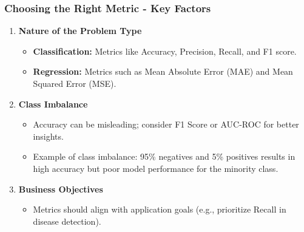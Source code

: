 \documentclass[aspectratio=169]{beamer}
\begin{document}
\begin{frame}[fragile]
    \frametitle{Choosing the Right Metric - Key Factors}
    \begin{enumerate}
        \item \textbf{Nature of the Problem Type}
            \begin{itemize}
                \item \textbf{Classification:} Metrics like Accuracy, Precision, Recall, and F1 score.
                \item \textbf{Regression:} Metrics such as Mean Absolute Error (MAE) and Mean Squared Error (MSE).
            \end{itemize}
        \item \textbf{Class Imbalance}
            \begin{itemize}
                \item Accuracy can be misleading; consider F1 Score or AUC-ROC for better insights.
                \item Example of class imbalance: 95\% negatives and 5\% positives results in high accuracy but poor model performance for the minority class.
            \end{itemize}
        \item \textbf{Business Objectives}
            \begin{itemize}
                \item Metrics should align with application goals (e.g., prioritize Recall in disease detection).
            \end{itemize}
    \end{enumerate}
\end{frame}
\end{document}
